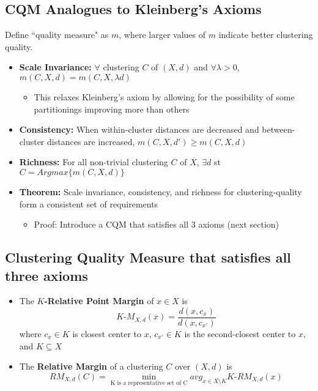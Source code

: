 \subsection*{CQM Analogues to Kleinberg's Axioms}

Define ``quality measure" as $m$, where larger values of $m$ indicate better clustering quality.

  \begin{itemize}
    \item \textbf{Scale Invariance:} $\forall$ clustering $C$ of $(X,d)$ and $\forall\lambda>0$, $m(C,X,d)=m(C,X,\lambda d)$
        \begin{itemize}
            \item This relaxes Kleinberg's axiom by allowing for the possibility of some partitionings improving more than others
        \end{itemize}
    \item \textbf{Consistency:} When within-cluster distances are decreased and between-cluster distances are increased, $m(C,X,d')\geq m(C,X,d)$
    \item \textbf{Richness:} For all non-trivial clustering $C$ of $X$, $\exists d$ st $C=Argmax\{m(C,X,d)\}$
    \item \textbf{Theorem:} Scale invariance, consistency, and richness for clustering-quality form a consistent set of requirements
    \begin{itemize}
        \item Proof: Introduce a CQM that satisfies all 3 axioms (next section)
    \end{itemize}
  \end{itemize}
  
\subsection*{Clustering Quality Measure that satisfies all three axioms}

\begin{itemize}
    \item The \textbf{$K$-Relative Point Margin} of $x\in X$ is $$K\text{-}M_{X,d}(x)=\frac{d(x,c_x)}{d(x,c_{x'})}$$ where $c_x\in K$ is closest center to $x$, $c_{x'}\in K$ is the second-closest center to $x$, and $K\subseteq X$
    \item The \textbf{Relative Margin} of a clustering $C$ over $(X,d)$ is $$RM_{X,d}(C)=\min_{\text{K is a representative set of C}} avg_{x\in X\setminus K}K\text{-}RM_{X,d}(x)$$
    
\end{itemize}

